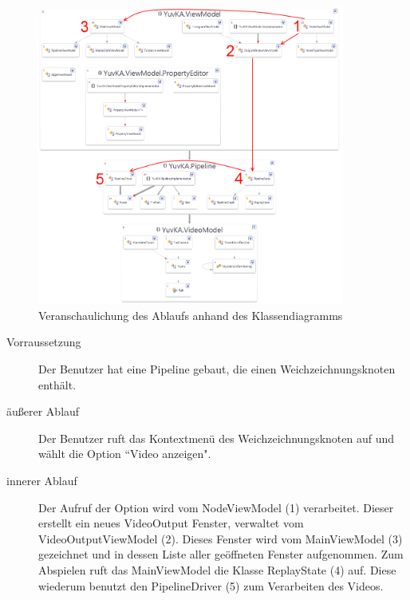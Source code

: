 \begin{figure}[h!]
\begin{center}
\includegraphics[width=0.9\textwidth]{Diagrams/visualization_TC2.png}
\end{center}
\caption{Veranschaulichung des Ablaufs anhand des Klassendiagramms}
\end{figure}
\begin{description}
	\item[Vorraussetzung] Der Benutzer hat eine Pipeline gebaut, die einen Weichzeichnungsknoten enthält.
	\item[äußerer Ablauf] Der Benutzer ruft das Kontextmenü des Weichzeichnungsknoten auf und wählt die Option ``Video anzeigen".
	\item[innerer Ablauf] Der Aufruf der Option wird vom NodeViewModel (1) verarbeitet. Dieser erstellt ein neues VideoOutput Fenster, verwaltet vom VideoOutputViewModel (2). Dieses Fenster wird vom MainViewModel (3) gezeichnet und in dessen Liste aller geöffneten Fenster aufgenommen. Zum Abspielen ruft das MainViewModel die Klasse ReplayState (4) auf. Diese wiederum benutzt den PipelineDriver (5) zum Verarbeiten des Videos.
\end{description}
\newpage
